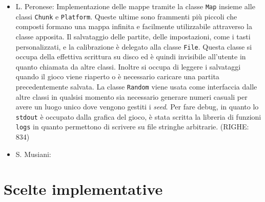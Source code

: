 \documentclass[a4paper]{article}
\begin{document}
\begin{itemize}
  \item L. Peronese: Implementazione delle mappe tramite la classe \texttt{Map}
    insieme alle classi \texttt{Chunk} e \texttt{Platform}. Queste ultime sono
    frammenti più piccoli che composti formano una mappa infinita  e facilmente 
    utilizzabile attraverso la classe apposita. Il salvataggio delle partite, 
    delle impostazioni, come i tasti personalizzati, e la calibrazione è 
    delegato alla classe \texttt{File}. Questa classe si occupa della effettiva 
    scrittura su disco ed è quindi invisibile all'utente in quanto chiamata da 
    altre classi. Inoltre si occupa di leggere i salvataggi quando 
    il gioco viene riaperto o è necessario caricare una partita precedentemente 
    salvata. La classe \texttt{Random} viene usata come interfaccia dalle altre
    classi in qualsisi momento sia necessario generare numeri casuali per avere
    un luogo unico dove vengono gestiti i \emph{seed}. Per fare debug, in quanto
    lo \texttt{stdout} è occupato dalla grafica del gioco, è stata scritta la 
    libreria di funzioni \texttt{logs} in quanto permettono di scrivere su file 
    stringhe arbitrarie. (RIGHE: 834)

  \item S. Musiani:
\end{itemize}

\section{Scelte implementative}
\end{document}
